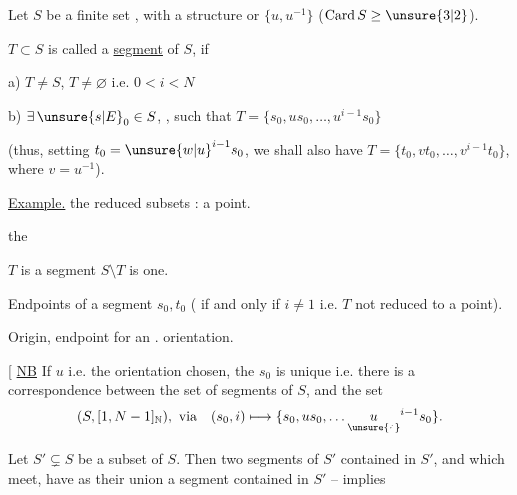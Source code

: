 Let $S$ be a finite set , with a  structure or  $\{u,u^{-1}\}$ ($\mathrm{Card}\,S\geq\unsure{3|2}$).\unsure{,}

 $T\subset S$  is called a  \uline{segment} of $S$, if

a)  $T\ne S$, $T\ne\varnothing$  i.e. $0<i<N$

b) $\exists\,\unsure{s|E}_0\in S$, , such that $T=\{s_0,us_0,\ldots,u^{i-1}s_0\}$

(thus, setting $t_0={\unsure{w|u}}^{i-1}s_0$, we shall also have $T=\{t_0,vt_0,\ldots,v^{i-1}t_0\}$, where $v=u^{-1}$).

\uline{Example.} the reduced subsets : a point.

the 


$T$ is a segment  $S\setminus T$ is one.




Endpoints of a segment $s_0,t_0$ ( if and only if $i\ne1$ i.e. $T$ not reduced to a point).

Origin, endpoint for an . orientation.

[ \uline{NB} If $u$ i.e. the orientation chosen, the $s_0$ is unique i.e. there is a  correspondence between the set of segments of $S$, and the set
\[
 (S,[1,N-1]_{\mathbb N}),\ \text{via}\quad (s_0,i)\longmapsto\{s_0,us_0,\ldots \underset{\unsure{\cdot\!{}^{\cdot}}}{u}^{i-1}s_0\}.
\]

Let $S'\subsetneq S$ be a subset of $S$. Then  two segments of $S'$ contained in $S'$, and which meet, have as their union a segment  contained in $S'$ --  implies

\clearpage
